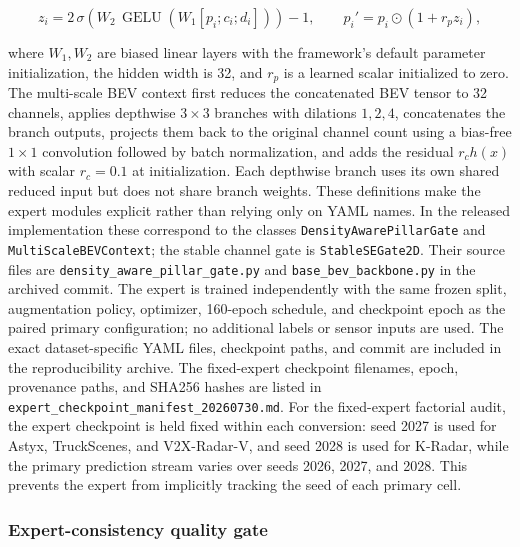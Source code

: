 \documentclass[preprint,12pt,times]{elsarticle}
\begin{document}
\begin{equation}
z_i=2\,\sigma\!\left(W_2\,\operatorname{GELU}\!\left(W_1[p_i;c_i;d_i]\right)\right)-1,
\qquad p_i' = p_i\odot(1+r_p z_i),
\end{equation}

where $W_1,W_2$ are biased linear layers with the framework's default parameter
initialization, the hidden width is 32, and $r_p$ is a learned scalar
initialized to zero. The multi-scale
BEV context first reduces the concatenated BEV tensor to 32 channels, applies
depthwise $3\times3$ branches with dilations $1,2,4$, concatenates the branch
outputs, projects them back to the original channel count using a bias-free
$1\times1$ convolution followed by batch normalization, and adds the residual
$r_c h(x)$ with scalar $r_c=0.1$ at initialization. Each depthwise branch uses
its own shared reduced input but does not share branch weights. These definitions make
the expert modules explicit rather than relying only on YAML names. In the
released implementation these correspond to the classes
\texttt{DensityAwarePillarGate} and \texttt{MultiScaleBEVContext}; the stable
channel gate is \texttt{StableSEGate2D}. Their source files are
\texttt{density\_aware\_pillar\_gate.py} and
\texttt{base\_bev\_backbone.py} in the archived commit. The expert
is trained independently with the
same frozen split, augmentation policy, optimizer, 160-epoch schedule, and
checkpoint epoch as the paired primary configuration; no additional labels or
sensor inputs are used. The exact dataset-specific YAML files, checkpoint
paths, and commit are included in the reproducibility archive.
The fixed-expert checkpoint filenames, epoch, provenance paths, and SHA256
hashes are listed in
\texttt{expert\_checkpoint\_manifest\_20260730.md}.
For the fixed-expert factorial audit, the expert checkpoint is held fixed
within each conversion: seed 2027 is used for Astyx, TruckScenes, and
V2X-Radar-V, and seed 2028 is used for K-Radar, while the primary prediction
stream varies over seeds 2026, 2027, and 2028. This prevents the expert from
implicitly tracking the seed of each primary cell.

\subsubsection{Expert-consistency quality gate}
\end{document}

